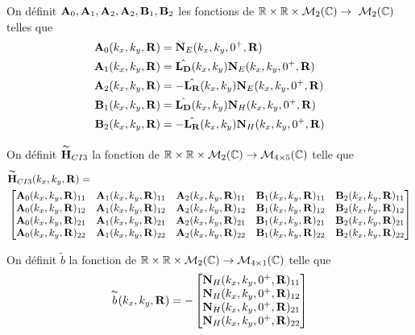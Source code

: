     \begin{defn}
      On définit \(\mathbf{A}_0,\mathbf{A}_1,\mathbf{A}_2,\mathbf{A}_2,\mathbf{B}_1,\mathbf{B}_2\) les fonctions de \(\mathbb R \times \mathbb R \times \mathcal{M}_2(\mathbb C) \rightarrow \ \mathcal{M}_2(\mathbb C)\) telles que        
      \begin{align*}
        \mathbf{A}_0(k_x,k_y,\mathbf{R}) &= \mathbf{N}_E(k_x,k_y,0^+,\mathbf{R})
        \\
        \mathbf{A}_1(k_x,k_y,\mathbf{R}) &= \hat{\mathbf{L_D}}(k_x,k_y)\mathbf{N}_E(k_x,k_y,0^+,\mathbf{R})
        \\
        \mathbf{A}_2(k_x,k_y,\mathbf{R}) &= -\hat{\mathbf{L_R}}(k_x,k_y)\mathbf{N}_E(k_x,k_y,0^+,\mathbf{R})
        \\
        \mathbf{B}_1(k_x,k_y,\mathbf{R}) &= \hat{\mathbf{L_D}}(k_x,k_y)\mathbf{N}_H(k_x,k_y,0^+,\mathbf{R})
        \\
        \mathbf{B}_2(k_x,k_y,\mathbf{R}) &= -\hat{\mathbf{L_R}}(k_x,k_y)\mathbf{N}_H(k_x,k_y,0^+,\mathbf{R})            
      \end{align*}

      On définit \(\overset{\thicksim}{\mathbf{H}}_{CI3}\) la fonction de \(\mathbb R \times \mathbb R \times \mathcal{M}_2(\mathbb C) \rightarrow \mathcal{M}_{4\times5}(\mathbb C)\) telle que
      \begin{align*}
        & \overset{\thicksim}{\mathbf{H}}_{CI3}(k_x,k_y,\mathbf{R}) =  \\ &
        \begin{bmatrix}
          \mathbf{A}_0(k_x,k_y,\mathbf{R})_{11} & \mathbf{A}_1(k_x,k_y,\mathbf{R})_{11} & \mathbf{A}_2(k_x,k_y,\mathbf{R})_{11} & \mathbf{B}_1(k_x,k_y,\mathbf{R})_{11} & \mathbf{B}_2(k_x,k_y,\mathbf{R})_{11}
          \\
          \mathbf{A}_0(k_x,k_y,\mathbf{R})_{12} & \mathbf{A}_1(k_x,k_y,\mathbf{R})_{12} & \mathbf{A}_2(k_x,k_y,\mathbf{R})_{12} & \mathbf{B}_1(k_x,k_y,\mathbf{R})_{12} & \mathbf{B}_2(k_x,k_y,\mathbf{R})_{12}
          \\
          \mathbf{A}_0(k_x,k_y,\mathbf{R})_{21} & \mathbf{A}_1(k_x,k_y,\mathbf{R})_{21} & \mathbf{A}_2(k_x,k_y,\mathbf{R})_{21} & \mathbf{B}_1(k_x,k_y,\mathbf{R})_{21} & \mathbf{B}_2(k_x,k_y,\mathbf{R})_{21}
          \\
          \mathbf{A}_0(k_x,k_y,\mathbf{R})_{22} & \mathbf{A}_1(k_x,k_y,\mathbf{R})_{22} & \mathbf{A}_2(k_x,k_y,\mathbf{R})_{22} & \mathbf{B}_1(k_x,k_y,\mathbf{R})_{22} & \mathbf{B}_2(k_x,k_y,\mathbf{R})_{22}
        \end{bmatrix}
      \end{align*}

      On définit \(\tilde{b}\) la fonction de \(\mathbb R \times \mathbb R \times \mathcal{M}_2(\mathbb C) \rightarrow \mathcal{M}_{4\times1}(\mathbb C)\) telle que
      \begin{equation*}
        \overset{\thicksim}{b}(k_x,k_y,\mathbf{R}) = -
        \begin{bmatrix}
          \mathbf{N}_H(k_x,k_y,0^+,\mathbf{R})_{11}
          \\
          \mathbf{N}_H(k_x,k_y,0^+,\mathbf{R})_{12}
          \\
          \mathbf{N}_H(k_x,k_y,0^+,\mathbf{R})_{21}
          \\
          \mathbf{N}_H(k_x,k_y,0^+,\mathbf{R})_{22}
        \end{bmatrix}
      \end{equation*}
    \end{defn}

